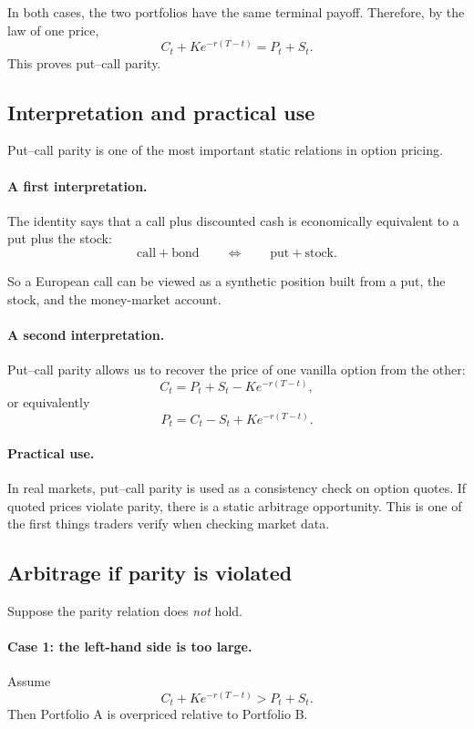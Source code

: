 \documentclass[11pt]{article}
\newcommand{\1}{\mathbf{1}}
\theoremstyle{plain}
\theoremstyle{definition}
\theoremstyle{remark}
\begin{document}
In both cases, the two portfolios have the same terminal payoff. Therefore,
by the law of one price,
\[
C_t + K e^{-r(T-t)} = P_t + S_t.
\]
This proves put--call parity.

\subsection{Interpretation and practical use}

Put--call parity is one of the most important static relations in option pricing.

\paragraph{A first interpretation.}
The identity says that a call plus discounted cash is economically equivalent
to a put plus the stock:
\[
\text{call} + \text{bond}
\qquad\Longleftrightarrow\qquad
\text{put} + \text{stock}.
\]

So a European call can be viewed as a synthetic position built from a put,
the stock, and the money-market account.

\paragraph{A second interpretation.}
Put--call parity allows us to recover the price of one vanilla option from the other:
\[
C_t = P_t + S_t - K e^{-r(T-t)},
\]
or equivalently
\[
P_t = C_t - S_t + K e^{-r(T-t)}.
\]

\paragraph{Practical use.}
In real markets, put--call parity is used as a consistency check on option quotes.
If quoted prices violate parity, there is a static arbitrage opportunity.
This is one of the first things traders verify when checking market data.

\subsection{Arbitrage if parity is violated}

Suppose the parity relation does \emph{not} hold.

\paragraph{Case 1: the left-hand side is too large.}
Assume
\[
C_t + K e^{-r(T-t)} > P_t + S_t.
\]
Then Portfolio A is overpriced relative to Portfolio B.
\end{document}
